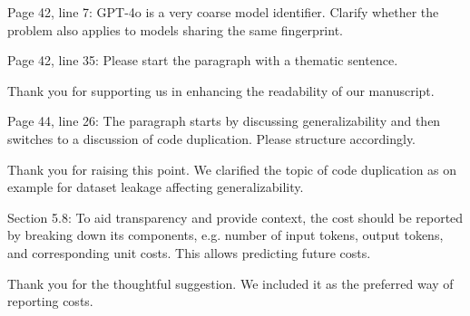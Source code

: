\documentclass[12pt,english]{reviewresponse}
\begin{document}
\begin{revcomment}
Page 42, line 7: GPT-4o is a very coarse model identifier. Clarify whether the problem also applies to models sharing the same fingerprint.
\end{revcomment}
\begin{revresponse}
\end{revresponse}

\begin{revcomment}
Page 42, line 35: Please start the paragraph with a thematic sentence.
\end{revcomment}
\begin{revresponse}
    Thank you for supporting us in enhancing the readability of our manuscript.
\end{revresponse}

\begin{revcomment}
Page 44, line 26: The paragraph starts by discussing generalizability and then switches to a discussion of code duplication. Please structure accordingly.
\end{revcomment}
\begin{revresponse}
    Thank you for raising this point. We clarified the topic of code duplication as on example for dataset leakage affecting generalizability.
\end{revresponse}

\begin{revcomment}
Section 5.8: To aid transparency and provide context, the cost should be reported by breaking down its components, e.g. number of input tokens, output tokens, and corresponding unit costs. This allows predicting future costs.
\end{revcomment}
\begin{revresponse}
    Thank you for the thoughtful suggestion. We included it as the preferred way of reporting costs.
\end{revresponse}
\end{document}

